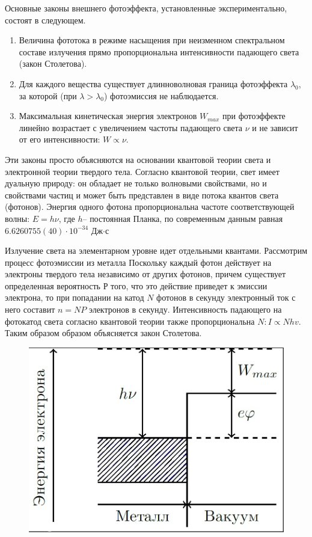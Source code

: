 Основные законы внешнего фотоэффекта, установленные экспериментально, состоят в следующем.
\begin{enumerate}
 	\item Величина фототока в режиме насыщения при неизменном спектральном составе излучения прямо пропорциональна интенсивности падающего света (закон Столетова).
	 \item Для каждого вещества существует длинноволновая граница фотоэффекта $\lambda_0$, за которой (при $\lambda>\lambda_0$) фотоэмиссия не наблюдается.
	 \item Максимальная кинетическая энергия электронов $W_{max}$ при фотоэффекте линейно возрастает с увеличением частоты падающего света $\nu$ и не зависит от его интенсивности: $W\propto \nu$.
\end{enumerate}

Эти законы просто объясняются на основании квантовой теории света и электронной теории твердого тела. Согласно квантовой теории, свет имеет дуальную природу: он обладает не только волновыми свойствами, но и свойствами частиц и может быть представлен в виде потока квантов света (фотонов). Энергия одного фотона пропорциональна частоте соответствующей волны: $E=h \nu$, где $h$-- постоянная Планка, по современным данным равная $6.6260755(40)\cdot10^{-34}$ Дж$\cdot$с

Излучение света на элементарном уровне идет отдельными квантами. Рассмотрим процесс фотоэмиссии из металла Поскольку каждый фотон действует на электроны твердого тела независимо от других фотонов, причем существует определенная вероятность $Р$ того, что это действие приведет к эмиссии электрона, то при попадании на катод $N$ фотонов в секунду электронный ток с него составит $n=NP$ электронов в секунду. Интенсивность падающего на фотокатод света согласно квантовой теории также пропорциональна $N: I\propto Nhv$. Таким образом образом объясняется закон Столетова.

\begin{figure}[H]
	\centering
	\includegraphics[width=0.6\linewidth]{fig/fig11}
	\label{fig:1}
\end{figure}

